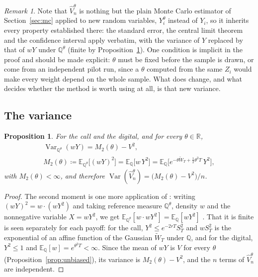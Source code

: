 \documentclass[11pt,a4paper]{article}
\theoremstyle{plain}
\newtheorem{proposition}[theorem]{Proposition}
\theoremstyle{definition}
\theoremstyle{remark}
\newtheorem{remark}[theorem]{Remark}
\newcommand{\R}{\mathbb{R}}
\newcommand{\E}{\mathbb{E}}
\newcommand{\Q}{\mathbb{Q}}
\newcommand{\1}{\mathbf{1}}
\newcommand{\eqdef}{\coloneqq}
\newcommand{\Var}{\operatorname{Var}}
\newcommand{\Wt}{\widetilde{W}}
\newcommand{\Qt}{\Q^{\theta}}
\begin{document}
\begin{remark}\label{rem:same-stats}
Note that $\hat V_n^\theta$ is nothing but the plain Monte Carlo estimator of Section~\ref{sec:mc} applied to new random variables, $Y_i^\theta$ instead of $Y_i$, so it inherits every property established there: the standard error, the central limit theorem and the confidence interval apply verbatim, with the variance of $Y$ replaced by that of $wY$ under $\Qt$ (finite by Proposition~\ref{prop:variance}). One condition is implicit in the proof and should be made explicit: $\theta$ must be fixed before the sample is drawn, or come from an independent pilot run, since a $\theta$ computed from the same $Z_i$ would make every weight depend on the whole sample. What does change, and what decides whether the method is worth using at all, is that new variance.
\end{remark}

\subsection{The variance}

\begin{proposition}\label{prop:variance}
For the call and the digital, and for every $\theta \in \R$,
\begin{equation}\label{eq:M2}
\begin{gathered}
  \Var_{\Qt}(wY) = M_2(\theta) - V^2,
  \\
  M_2(\theta) \eqdef \E_{\Qt}\bigl[(wY)^2\bigr] = \E_\Q\bigl[w\, Y^2\bigr]
  = \E_\Q\bigl[e^{-\theta\Wt_T + \frac12\theta^2 T}\, Y^2\bigr],
\end{gathered}
\end{equation}
with $M_2(\theta) < \infty$, and therefore $\Var(\hat V_n^\theta) = \bigl(M_2(\theta) - V^2\bigr)/n$.
\end{proposition}

\begin{proof}
The second moment is one more application of \cite[(4.24)]{tfg}: writing $(wY)^2 = w \cdot (wY^2)$ and taking reference measure $\Qt$, density $w$ and the nonnegative variable $X = wY^2$, we get $\E_{\Qt}[w \cdot wY^2] = \E_\Q[wY^2]$ \cite[\S 4.6.1]{glasserman}. That it is finite is seen separately for each payoff: for the call, $Y^2 \le e^{-2rT}S_T^2$ and $wS_T^2$ is the exponential of an affine function of the Gaussian $\Wt_T$ under $\Q$, and for the digital, $Y^2 \le 1$ and $\E_\Q[w] = e^{\theta^2 T} < \infty$. Since the mean of $wY$ is $V$ for every $\theta$ (Proposition~\ref{prop:unbiased}), its variance is $M_2(\theta) - V^2$, and the $n$ terms of $\hat V_n^\theta$ are independent.
\end{proof}
\end{document}
